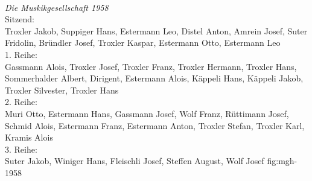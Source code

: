 \begin{figure}[ht]
    \hfil
    \\
    \hfil
\end{figure}

{\emph{Die Muskikgesellschaft 1958}\\
    Sitzend:\\
    Troxler Jakob, Suppiger Hans, Estermann Leo, Distel Anton, Amrein Josef,
    Suter Fridolin, Bründler Josef, Troxler Kaspar, Estermann Otto, Estermann
    Leo\\
    1. Reihe:\\
    Gassmann Alois, Troxler Josef, Troxler Franz, Troxler Hermann, Troxler Hans,
    Sommerhalder Albert, Dirigent, Estermann Alois, Käppeli Hans, Käppeli Jakob,
    Troxler Silvester, Troxler Hans\\
    2. Reihe:\\
    Muri Otto, Estermann Hans, Gassmann Josef, Wolf Franz, Rüttimann Josef,
    Schmid Alois, Estermann Franz, Estermann Anton, Troxler Stefan, Troxler
    Karl, Kramis Alois\\
    3. Reihe:\\
    Suter Jakob, Winiger Hans, Fleischli Josef, Steffen August, Wolf Josef }
{fig:mgh-1958}

